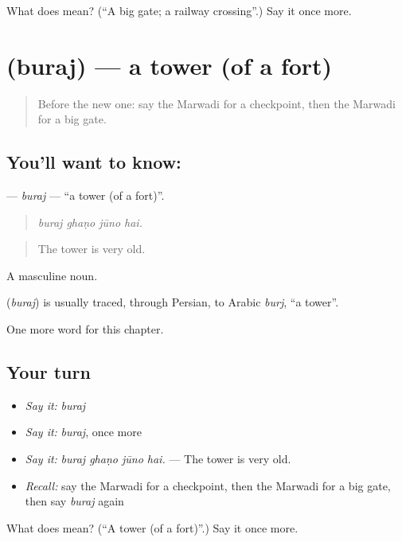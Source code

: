 \begin{tcolorbox}[breakable,colback=teal!4,colframe=teal!35!black,title={Before you move on}]
What does  mean? (\textquotedblleft{}A big gate; a railway crossing\textquotedblright{}.) Say it once more.
\end{tcolorbox}
\section[\texorpdfstring{\mw{बुरज} (buraj)}{बुरज (buraj)}]{ (buraj) — a tower (of a fort)}

\label{lesson:MW-C207-buraj}



\begin{quote}
Before the new one: say the Marwadi for a checkpoint, then the Marwadi for a big gate.
\end{quote}

\subsection*{You'll want to know: }
\textbf{} — \emph{buraj} — \textquotedblleft{}a tower (of a fort)\textquotedblright{}.

\begin{quote}
   
\end{quote}

\begin{quote}
\emph{buraj ghaṇo jūno hai.}
\end{quote}

\begin{quote}
The tower is very old.
\end{quote}

A masculine noun.

\begin{cousinweb}
\textbf{} (\emph{buraj}) is usually traced, through Persian, to Arabic \emph{burj}, \textquotedblleft{}a tower\textquotedblright{}.
\end{cousinweb}

\begin{grammarlens}[title={What you've built}]
One more word for this chapter.
\end{grammarlens}

\subsection*{Your turn}
\begin{itemize}
\raggedright
  \item \emph{Say it:} \emph{buraj}
  \item \emph{Say it:} \emph{buraj}, once more
  \item \emph{Say it:} \emph{buraj ghaṇo jūno hai.} — The tower is very old.
  \item \emph{Recall:} say the Marwadi for a checkpoint, then the Marwadi for a big gate, then say \emph{buraj} again
\end{itemize}

\begin{tcolorbox}[breakable,colback=teal!4,colframe=teal!35!black,title={Before you move on}]
What does  mean? (\textquotedblleft{}A tower (of a fort)\textquotedblright{}.) Say it once more.
\end{tcolorbox}

